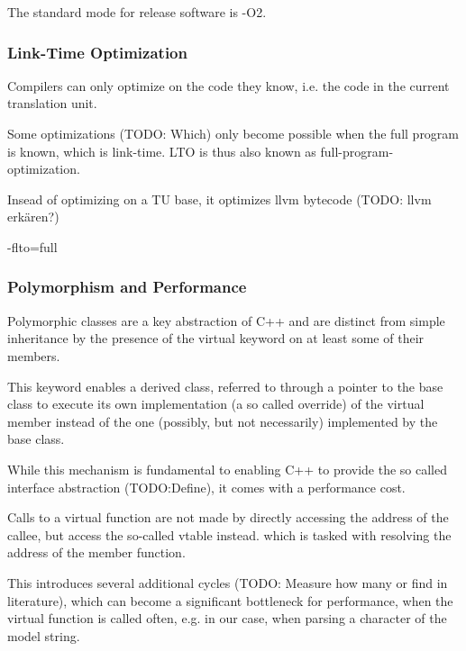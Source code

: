 The standard mode for release software is -O2.

\subsubsection{Link-Time Optimization}
Compilers can only optimize on the code they know, i.e. the code in the current translation unit.

Some optimizations (TODO: Which) only become possible when the full program is known, which is link-time. LTO is thus also known as full-program-optimization.

Insead of optimizing on a TU base, it optimizes llvm bytecode (TODO: llvm erkären?)

-flto=full


\subsubsection{Polymorphism and Performance}
Polymorphic classes are a key abstraction of C++ and are distinct from simple inheritance by the presence of the virtual keyword on at least some of their members.

This keyword enables a derived class, referred to through a pointer to the base class to execute its own implementation (a so called override) of the virtual member instead of the one (possibly, but not necessarily) implemented by the base class.

While this mechanism is fundamental to enabling C++ to provide the so called interface abstraction (TODO:Define), it comes with a performance cost.

Calls to a virtual function are not made by directly accessing the address of the callee, but access the so-called vtable instead. which is tasked with resolving the address of the member function.

This introduces several additional cycles (TODO: Measure how many or find in literature), which can become a significant bottleneck for performance, when the virtual function is called often, e.g. in our case, when parsing a character of the model string.

